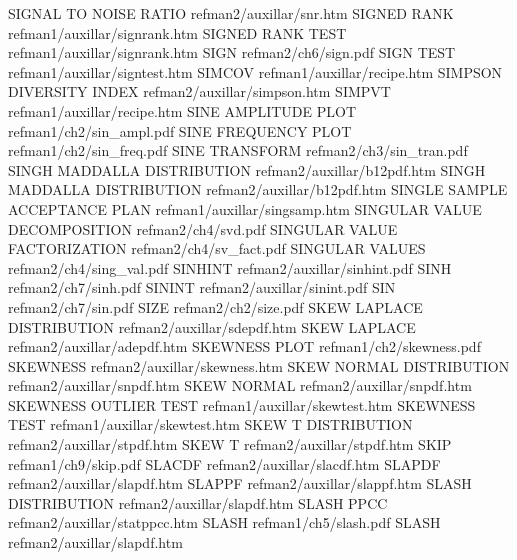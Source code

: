 SIGNAL TO NOISE RATIO                   refman2/auxillar/snr.htm
SIGNED RANK                             refman1/auxillar/signrank.htm
SIGNED RANK TEST                        refman1/auxillar/signrank.htm
SIGN                                    refman2/ch6/sign.pdf
SIGN TEST                               refman1/auxillar/signtest.htm
SIMCOV                                  refman1/auxillar/recipe.htm
SIMPSON DIVERSITY INDEX                 refman2/auxillar/simpson.htm
SIMPVT                                  refman1/auxillar/recipe.htm
SINE AMPLITUDE PLOT                     refman1/ch2/sin_ampl.pdf
SINE FREQUENCY PLOT                     refman1/ch2/sin_freq.pdf
SINE TRANSFORM                          refman2/ch3/sin_tran.pdf
SINGH MADDALLA DISTRIBUTION             refman2/auxillar/b12pdf.htm
SINGH MADDALLA DISTRIBUTION             refman2/auxillar/b12pdf.htm
SINGLE SAMPLE ACCEPTANCE PLAN           refman1/auxillar/singsamp.htm
SINGULAR VALUE DECOMPOSITION            refman2/ch4/svd.pdf
SINGULAR VALUE FACTORIZATION            refman2/ch4/sv_fact.pdf
SINGULAR VALUES                         refman2/ch4/sing_val.pdf
SINHINT                                 refman2/auxillar/sinhint.pdf
SINH                                    refman2/ch7/sinh.pdf
SININT                                  refman2/auxillar/sinint.pdf
SIN                                     refman2/ch7/sin.pdf
SIZE                                    refman2/ch2/size.pdf
SKEW LAPLACE DISTRIBUTION               refman2/auxillar/sdepdf.htm
SKEW LAPLACE                            refman2/auxillar/adepdf.htm
SKEWNESS PLOT                           refman1/ch2/skewness.pdf
SKEWNESS                                refman2/auxillar/skewness.htm
SKEW NORMAL DISTRIBUTION                refman2/auxillar/snpdf.htm
SKEW NORMAL                             refman2/auxillar/snpdf.htm
SKEWNESS OUTLIER TEST                   refman1/auxillar/skewtest.htm
SKEWNESS TEST                           refman1/auxillar/skewtest.htm
SKEW T DISTRIBUTION                     refman2/auxillar/stpdf.htm
SKEW T                                  refman2/auxillar/stpdf.htm
SKIP                                    refman1/ch9/skip.pdf
SLACDF                                  refman2/auxillar/slacdf.htm
SLAPDF                                  refman2/auxillar/slapdf.htm
SLAPPF                                  refman2/auxillar/slappf.htm
SLASH DISTRIBUTION                      refman2/auxillar/slapdf.htm
SLASH PPCC                              refman2/auxillar/statppcc.htm
SLASH                                   refman1/ch5/slash.pdf
SLASH                                   refman2/auxillar/slapdf.htm

